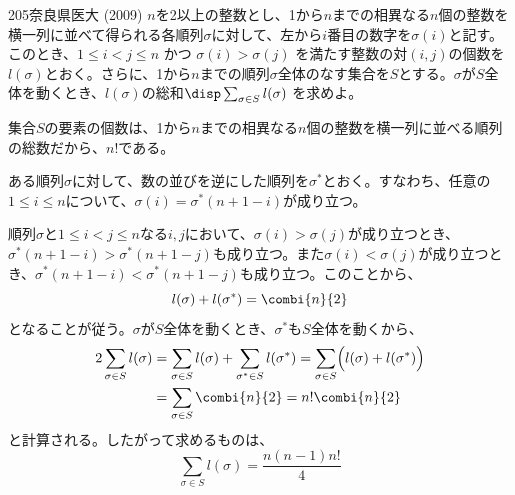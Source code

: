 \begin{prob}{205}{}{奈良県医大 (2009)}
 $n$を2以上の整数とし、1から$n$までの相異なる$n$個の整数を横一列に並べて得られる各順列$\sigma$に対して、左から$i$番目の数字を$\sigma(i)$と記す。このとき、$1\le i < j \le n$ かつ $\sigma(i)>\sigma(j)$ を満たす整数の対$(i,j)$の個数を$l(\sigma)$とおく。さらに、1から$n$までの順列$\sigma$全体のなす集合を$S$とする。$\sigma$が$S$全体を動くとき、$l(\sigma)$の総和$\disp \sum_{\sigma\in S} l(\sigma)$ を求めよ。
\end{prob}
集合$S$の要素の個数は、1から$n$までの相異なる$n$個の整数を横一列に並べる順列の総数だから、$n!$である。

ある順列$\sigma$に対して、数の並びを逆にした順列を$\sigma^*$とおく。すなわち、任意の$1\le i\le n$について、$\sigma(i)=\sigma^*(n+1-i)$が成り立つ。

順列$\sigma$と$1\le i < j \le n$なる$i,j$において、$\sigma(i)>\sigma(j)$が成り立つとき、$\sigma^*(n+1-i)>\sigma^*(n+1-j)$も成り立つ。また$\sigma(i)<\sigma(j)$が成り立つとき、$\sigma^*(n+1-i)<\sigma^*(n+1-j)$も成り立つ。このことから、
\[ l(\sigma)+l(\sigma^*)=\combi{n}{2} \]
となることが従う。$\sigma$が$S$全体を動くとき、$\sigma^*$も$S$全体を動くから、
\begin{align*}
 2\sum_{\sigma\in S} l(\sigma) &= \sum_{\sigma\in S} l(\sigma) + \sum_{\sigma^*\in S} l(\sigma^*)=\sum_{\sigma\in S} \Bigl(l(\sigma)+l(\sigma^*)\Bigr) \\
 &=\sum_{\sigma\in S} \combi{n}{2}=n!\combi{n}{2}
\end{align*}
と計算される。したがって求めるものは、
\[ \sum_{\sigma\in S} l(\sigma) = \frac{n(n-1)n!}{4} \]
